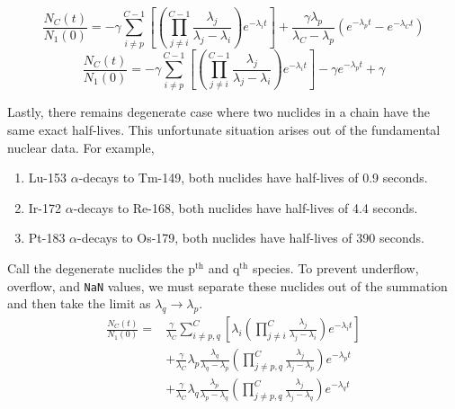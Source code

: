 \documentclass[letterpaper]{physor2018}
\newcommand{\pth}{p$^{\mathrm{th}}$\xspace}
\newcommand{\qth}{q$^{\mathrm{th}}$\xspace}
\begin{document}
\begin{equation}
\label{last-stable-and-almost-stable-3}
   \frac{N_C(t)}{N_1(0)} = -\gamma\sum_{i\ne p}^{C-1} \left[\left(\prod_{j\ne i}^{C-1} \frac{\lambda_j}{\lambda_j - \lambda_i}\right) e^{-\lambda_i t}\right]
                           + \frac{\gamma\lambda_p}{\lambda_C - \lambda_p} \left(e^{-\lambda_p t} - e^{-\lambda_C t}\right)
\end{equation}
\begin{equation}
\label{last-stable-and-almost-stable-4}
   \frac{N_C(t)}{N_1(0)} = -\gamma\sum_{i\ne p}^{C-1} \left[\left(\prod_{j\ne i}^{C-1} \frac{\lambda_j}{\lambda_j - \lambda_i}\right) e^{-\lambda_i t}\right]
                           -\gamma e^{-\lambda_p t} + \gamma
\end{equation}

Lastly, there remains degenerate case where two nuclides in a chain have the same exact half-lives.
This unfortunate situation arises out of the fundamental nuclear data. For example,
\begin{enumerate}
\item Lu-153 $\alpha$-decays to Tm-149, both nuclides have half-lives of 0.9 seconds.
\item Ir-172 $\alpha$-decays to Re-168, both nuclides have half-lives of 4.4 seconds.
\item Pt-183 $\alpha$-decays to Os-179, both nuclides have half-lives of 390 seconds.
\end{enumerate}
Call the degenerate nuclides the \pth and \qth species. To prevent underflow, overflow,
and \texttt{NaN} values, we must separate these nuclides out of the summation
and then take the limit as $\lambda_q \to \lambda_p$.
\begin{equation}
\label{pq-same-0}
\begin{split}
   \frac{N_C(t)}{N_1(0)} = & \frac{\gamma}{\lambda_C}\sum_{i\ne p,q}^{C} \left[\lambda_i \left(\prod_{j\ne i}^{C} \frac{\lambda_j}{\lambda_j - \lambda_i}\right) e^{-\lambda_i t}\right] \\
                           & + \frac{\gamma}{\lambda_C} \lambda_p \frac{\lambda_q}{\lambda_q - \lambda_p} \left(\prod_{j\ne p,q}^{C} \frac{\lambda_j}{\lambda_j - \lambda_p} \right) e^{-\lambda_p t} \\
                           & + \frac{\gamma}{\lambda_C} \lambda_q \frac{\lambda_p}{\lambda_p - \lambda_q} \left(\prod_{j\ne p,q}^{C} \frac{\lambda_j}{\lambda_j - \lambda_q} \right) e^{-\lambda_q t}
\end{split}
\end{equation}
\end{document}
